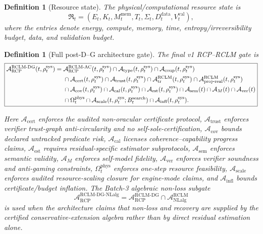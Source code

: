 \documentclass[11pt,a4paper]{article}
\newtheorem{definition}[theorem]{Definition}
\newcommand{\Acal}{\mathcal A}
\newcommand{\calib}{\mathrm{cal}}
\newcommand{\RCP}{\mathrm{RCP}}
\newcommand{\RCLM}{\mathrm{RCLM}}
\newcommand{\AC}{\mathrm{AC}}
\newcommand{\DG}{\mathrm{DG}}
\newcommand{\sem}{\mathrm{sem}}
\newcommand{\sys}{\mathrm{sys}}
\newcommand{\mem}{\mathrm{mem}}
\newcommand{\ver}{\mathrm{ver}}
\newcommand{\phys}{\mathrm{phys}}
\newcommand{\data}{\mathrm{data}}
\newcommand{\val}{\mathrm{val}}
\newcommand{\search}{\mathrm{search}}
\newcommand{\cert}{\mathrm{cert}}
\newcommand{\coup}{\mathrm{coup}}
\newcommand{\trust}{\mathrm{trust}}
\newcommand{\scale}{\mathrm{scale}}
\newcommand{\infl}{\mathrm{infl}}
\newcommand{\cov}{\mathrm{cov}}
\newcommand{\est}{\mathrm{est}}
\newcommand{\NLalg}{\mathrm{NLalg}}
\begin{document}
\begin{definition}[Resource state]
The physical/computational resource state is
\[
\mathfrak R_t=(E_t,K_t,M_t^{\mem},T_t,\Sigma_t,D_t^{\data},V_t^{\val}),
\]
where the entries denote energy, compute, memory, time, entropy/irreversibility budget, data, and validation budget.
\end{definition}

\begin{definition}[Full post-D--G architecture gate]
The final v1 RCP--RCLM gate is
\[
\boxed{%
\begin{aligned}
\Acal_{\RCP}^{\RCLM\text{-}\DG}(t,\rho_t^{\sys})
={}&
\Acal_{\RCP}^{\RCLM\text{-}\AC}(t,\rho_t^{\sys})
\cap \Acal_{\mathrm{type}}(t,\rho_t^{\sys})
\cap \Acal_{\coup}(t,\rho_t^{\sys})\\
&\cap \Acal_{\cert}(t,\rho_t^{\sys})
\cap \Acal_{\trust}(t,\rho_t^{\sys})
\cap \Acal_{\mathrm{tr}}^{\RCLM}(t,\rho_t^{\sys})
\cap \Acal_{\mathrm{proj\mbox{-}real}}^{\RCLM}(t,\rho_t^{\sys})\\
&\cap \Acal_{\cov}(t,\rho_t^{\sys})
\cap \Acal_{\calib}(t,\rho_t^{\sys})
\cap \Acal_{\est}(t,\rho_t^{\sys})
\cap \Acal_{\sem}(t)
\cap \Acal_M(t)
\cap \Acal_{\ver}(t)\\
&\cap \Omega_t^{\phys}
\cap \Acal_{\scale}(t,\rho_t^{\sys};B_t^{\search})
\cap \Acal_{\infl}(t,\rho_t^{\sys}).
\end{aligned}}
\]

Here \(
\Acal_{\cert}\) enforces the audited non-oracular certificate protocol, \(
\Acal_{\trust}\) enforces verifier trust-graph anti-circularity and no self-sole-certification, \(
\Acal_{\cov}\) bounds declared untracked predicate risk, \(
\Acal_{\calib}\) licenses coherence--capability progress claims, \(
\Acal_{\est}\) requires residual-specific estimator subprotocols, \(
\Acal_{\sem}\) enforces semantic validity, \(
\Acal_M\) enforces self-model fidelity, \(
\Acal_{\ver}\) enforces verifier soundness and anti-gaming constraints, \(
\Omega_t^{\phys}\) enforces one-step resource feasibility, \(
\Acal_{\scale}\) enforces audited resource-scaling closure for engine-mode claims, and \(
\Acal_{\infl}\) bounds certificate/budget inflation.  The Batch-3 algebraic non-loss subgate
\[
\Acal_{\RCP}^{\RCLM\text{-}\DG\text{-}\NLalg}
=
\Acal_{\RCP}^{\RCLM\text{-}\DG}\cap\Acal_{\NLalg}^{\RCLM}
\]
is used when the architecture claims that non-loss and recovery are supplied by the certified conservative-extension algebra rather than by direct residual estimation alone.
\end{definition}
\end{document}
